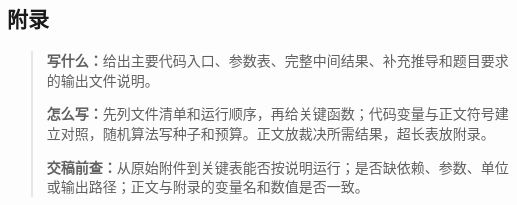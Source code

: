 \subsection{附录}
\begin{quote}\small
\noindent\textbf{\color{inkblue}写什么：}给出主要代码入口、参数表、完整中间结果、补充推导和题目要求的输出文件说明。\par
\noindent\textbf{\color{inkblue}怎么写：}先列文件清单和运行顺序，再给关键函数；代码变量与正文符号建立对照，随机算法写种子和预算。正文放裁决所需结果，超长表放附录。\par
\noindent\textbf{\color{inkblue}交稿前查：}从原始附件到关键表能否按说明运行；是否缺依赖、参数、单位或输出路径；正文与附录的变量名和数值是否一致。
\end{quote}

\appendix
